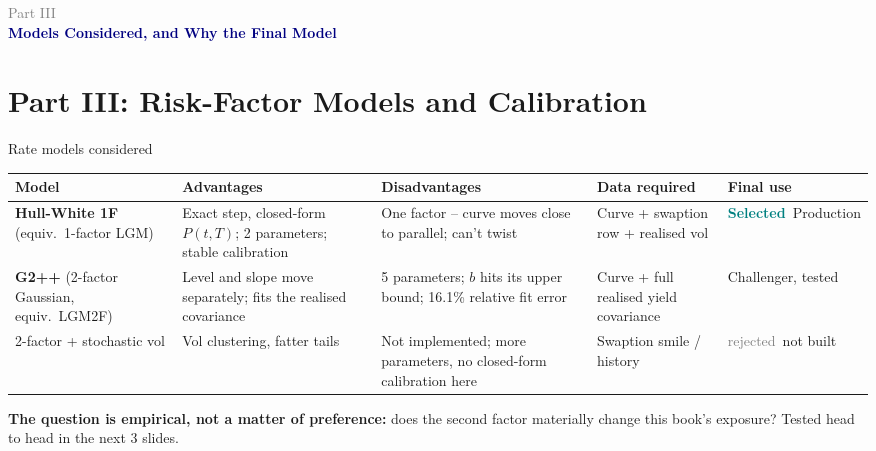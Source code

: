 \documentclass[8pt,aspectratio=169]{beamer}
\newcommand{\good}{\textcolor{teal}{\textbf{Selected}}}
\newcommand{\bad}{\textcolor{grey}{rejected}}
\newcommand{\partframe}[2]{%
\begin{frame}
  \vspace{1.2cm}
  {\large\textcolor{grey}{Part #1}}\\[4pt]
  {\Large\textcolor{navy}{\textbf{#2}}}
\end{frame}}
\begin{document}
\partframe{III}{Models Considered, and Why the Final Model}
\section{Part III: Risk-Factor Models and Calibration}

\begin{frame}{Rate models considered}
  \small
  \begin{tabular}{p{}p{}p{}p{}p{}}
    \toprule
    \textbf{Model} & \textbf{Advantages} & \textbf{Disadvantages} & \textbf{Data required} & \textbf{Final use} \\
    \midrule
    \textbf{Hull-White 1F} (equiv.\ 1-factor LGM) & Exact step, closed-form $P(t,T)$; 2 parameters; stable calibration & One factor -- curve moves close to parallel; can't twist & Curve + swaption row + realised vol & \good\ Production \\
    \textbf{G2++} (2-factor Gaussian, equiv.\ LGM2F) & Level and slope move separately; fits the realised covariance & 5 parameters; $b$ hits its upper bound; 16.1\% relative fit error & Curve + full realised yield covariance & Challenger, tested \\
    2-factor + stochastic vol & Vol clustering, fatter tails & Not implemented; more parameters, no closed-form calibration here & Swaption smile / history & \bad\ not built \\
    \bottomrule
  \end{tabular}
  \vspace{8pt}

  \textbf{The question is empirical, not a matter of preference:} does the second factor materially change this book's exposure? Tested head to head in the next 3 slides.
\end{frame}
\end{document}
